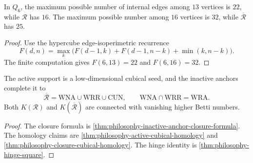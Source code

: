 \begin{theorem}
\label{thm:philosophy-isoperimetric-comparison}
In $Q_{6}$, the maximum possible number of internal edges among
$13$ vertices is $22$, while $\mathcal{R}$ has $16$. The maximum
possible number among $16$ vertices is $32$, while
$\overline{\mathcal{R}}$ has $25$.
\end{theorem}
\begin{proof}
Use the hypercube edge-isoperimetric recurrence
$$
  F(d,n)=
  \max_{k}
  \bigl(F(d-1,k)+F(d-1,n-k)+\min(k,n-k)\bigr).
$$
The finite computation gives $F(6,13)=22$ and $F(6,16)=32$.
\end{proof}

\begin{theorem}
\label{thm:philosophy-inactive-anchor-cubical-closure}
The active support is a low-dimensional cubical seed, and the inactive
anchors complete it to
$$
  \overline{\mathcal{R}}
  =
  \mathrm{WNA}\cup\mathrm{WRR}\cup\mathrm{CUN},
  \qquad
  \mathrm{WNA}\cap\mathrm{WRR}=\mathrm{WRA}.
$$
Both $K(\mathcal{R})$ and $K(\overline{\mathcal{R}})$ are connected
with vanishing higher Betti numbers.
\end{theorem}
\begin{proof}
The closure formula is
\autoref{thm:philosophy-inactive-anchor-closure-formula}. The
homology claims are
\autoref{thm:philosophy-active-cubical-homology} and
\autoref{thm:philosophy-closure-cubical-homology}. The hinge identity
is \autoref{thm:philosophy-hinge-square}.
\end{proof}
